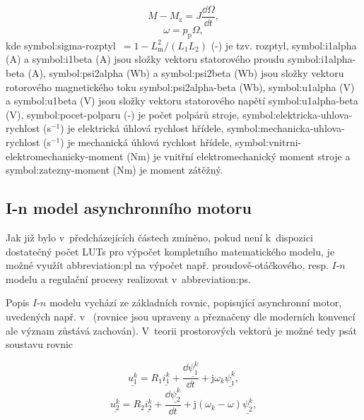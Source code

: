 \documentclass[a4paper, twoside, 11pt]{article}
\begin{document}
\begin{equation}
    M - M_\text{z} = J \frac{\dd{\Omega}}{\dd{t}},
\end{equation}
\begin{equation}
    \omega = p_\text{p} \Omega,
\end{equation}
kde \gls{symbol:sigma-rozptyl}~$= 1 - L_\text{m}^{2}/(L_1 L_2)$ (-) je tzv. rozptyl, \gls{symbol:i1alpha} (A) a \gls{symbol:i1beta} (A) jsou složky vektoru statorového proudu \gls{symbol:i1alpha-beta} (A), \gls{symbol:psi2alpha} (Wb) a \gls{symbol:psi2beta} (Wb) jsou složky vektoru rotorového magnetického toku \gls{symbol:psi2alpha-beta} (Wb), \gls{symbol:u1alpha} (V) a \gls{symbol:u1beta} (V) jsou složky vektoru statorového napětí \gls{symbol:u1alpha-beta} (V), \gls{symbol:pocet-polparu} (-) je počet polpárů stroje, \gls{symbol:elektricka-uhlova-rychlost} (s$^{-1}$) je elektrická úhlová rychlost hřídele, \gls{symbol:mechanicka-uhlova-rychlost} (s$^{-1}$) je mechanická úhlová rychlost hřídele, \gls{symbol:vnitrni-elektromechanicky-moment} (Nm) je vnitřní elektromechanický moment stroje a \gls{symbol:zatezny-moment} (Nm) je moment zátěžný.

	\subsection{I-n model asynchronního motoru}
		Jak již bylo v~předcházejících částech zmíněno, pokud není k~dispozici dostatečný počet LUTs pro výpočet kompletního matematického modelu, je možné využít \gls{abbreviation:pl} na výpočet např. proudově-otáčkového, resp. $I$-$n$ modelu a regulační procesy realizovat v~\gls{abbreviation:ps}.\par
		Popis $I$-$n$ modelu vychází ze základních rovnic, popisující asynchronní motor, uvedených např. v~\cite{kobrle-elektricke-pohony} (rovnice jsou upraveny a přeznačeny dle moderních konvencí ale význam zůstává zachován). V~teorii prostorových vektorů je možné tedy psát soustavu rovnic

		\begin{equation}
			\underline{u_{1}^{k}} = R_1 \underline{i_{1}^{k}} + \frac{\dd{\underline{\psi_1^{k}}}}{\dd{t}} + \text{j} \omega_k \underline{\psi_1^{k}},
		\end{equation}
		\begin{equation}
			\underline{u_{2}^{k}} = R_2 \underline{i_{2}^{k}} + \frac{\dd{\underline{\psi_2^{k}}}}{\dd{t}} + \text{j} (\omega_k - \omega) \underline{\psi_2^{k}},
		\end{equation}
	
\end{document}
